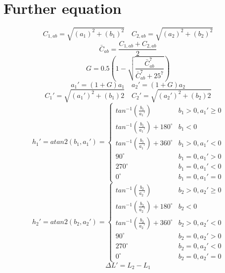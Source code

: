 \appendix
\section{Further equation}\label{further equation}
\begin{equation}
C_{1,ab}=\sqrt{(a_{1})^{2}+(b_{1})^{2}} \quad C_{2,ab}=\sqrt{(a_{2})^{2}+(b_{2})^{2}}
\end{equation}
\begin{equation}
\bar{C}_{ab}=\frac{C_{1,ab}+C_{2,ab}}{2}
\end{equation}
\begin{equation}
G = 0.5(1-\sqrt{\frac{\bar{C}_{ab}^{7}}{\bar{C}_{ab}^{7}+25^7}})
\end{equation}
\begin{equation}
a_{1}'=(1+G)a_{1} \quad a_{2}'=(1+G)a_{2} 
\end{equation}
\begin{equation}
C_{1}'=\sqrt{(a_{1}')^{2}+(b_{1})2} \quad C_{2}'=\sqrt{(a_{2}')^{2}+(b_{2})2}
\end{equation}
\begin{equation}
h_{1}' = atan2(b_{1},a_{1}') =
\begin{cases}
tan^{-1}(\frac{b_{1}}{a_{1}'}) & b_{1}>0,a_{1}' \geq 0\\
tan^{-1}(\frac{b_{1}}{a_{1}'})+180^{\circ} & b_{1}<0\\
tan^{-1}(\frac{b_{1}}{a_{1}'})+360^{\circ} & b_{1}>0,a_{1}'<0 \\
90^{\circ} & b_{1}=0,a_{1}'>0\\
270^{\circ} & b_{1}=0,a_{1}'<0\\
0^{\circ} & b_{1}=0,a_{1}'=0
\end{cases}
\end{equation}
\begin{equation}
h_{2}' = atan2(b_{2},a_{2}') =
\begin{cases}
tan^{-1}(\frac{b_{2}}{a_{2}'}) & b_{2}>0,a_{2}' \geq 0\\
tan^{-1}(\frac{b_{2}}{a_{2}'})+180^{\circ} & b_{2}<0\\
tan^{-1}(\frac{b_{2}}{a_{2}'})+360^{\circ} & b_{2}>0,a_{2}'<0 \\
90^{\circ} & b_{2}=0,a_{2}'>0\\
270^{\circ} & b_{2}=0,a_{2}'<0\\
0^{\circ} & b_{2}=0,a_{2}'=0
\end{cases}
\end{equation}
\begin{equation}
\Delta L'=L_{2}-L_{1}
\end{equation}
